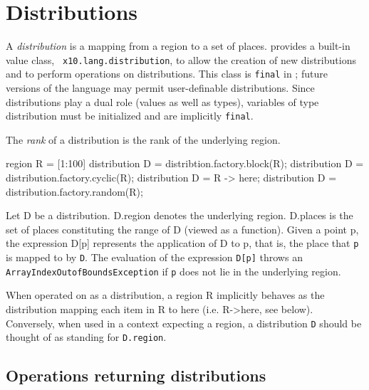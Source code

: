 \section{Distributions}\label{XtenDistributions}

A {\em distribution} is a mapping from a region to a set of places.
{}\Xten{} provides a built-in value class, {\tt
x10.lang.distribution}, to allow the creation of new distributions and
to perform operations on distributions. This class is {\tt final} in
{}\XtenCurrVer; future versions of the language may permit
user-definable distributions. Since distributions play a dual role
(values as well as types), variables of type {\cf distribution} must
be initialized and are implicitly {\tt final}.

The {\em rank} of a distribution is the rank of the underlying region.



\begin{x10}
region R = [1:100]
distribution D = distribtion.factory.block(R);
distribution D = distribution.factory.cyclic(R);
distribution D = R -> here;
distribution D = distribution.factory.random(R);
\end{x10}

Let {\cf D} be a distribution. {\cf D.region} denotes the underlying
region. {\cf D.places} is the set of places constituting the range of
{\cf D} (viewed as a function). Given a point {\cf p}, the expression
{\cf D[p]} represents the application of {\cf D} to {\cf p}, that is,
the place that {\tt p} is mapped to by {\tt D}. The evaluation of the
expression {\tt D[p]} throws an {\tt ArrayIndexOutofBoundsException}
if {\tt p} does not lie in the underlying region.

When operated on as a distribution, a region {\cf R} implicitly
behaves as the distribution mapping each item in {\cf R} to {\cf here}
(i.e.{} {\cf R->here}, see below). Conversely, when used in a context
expecting a region, a distribution {\tt D} should be thought of as
standing for {\tt D.region}.

{}

\subsection{Operations returning distributions}


